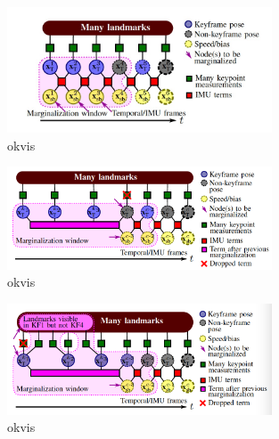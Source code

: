 \documentclass[12pt,twoside]{article}
\begin{document}
\begin{figure}[h]
    \centering
    \includegraphics[width=0.7\textwidth]{figures/okvis1}
    \caption{okvis\cite{leutenegger2015keyframe}}
    \label{fig:kinec}
\end{figure}

\begin{figure}[h]
    \centering
    \includegraphics[width=0.7\textwidth]{figures/okvis2}
     \caption{okvis\cite{leutenegger2015keyframe}}
    \label{fig:kinec}
\end{figure}

\begin{figure}[h]
    \centering
    \includegraphics[width=0.7\textwidth]{figures/okvis3}
   \caption{okvis\cite{leutenegger2015keyframe}}
    \label{fig:kinec}
\end{figure}
\end{document}
